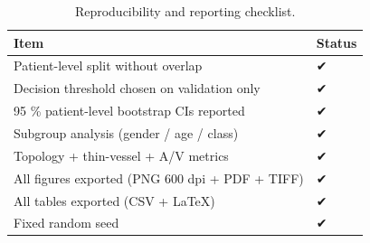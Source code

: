 \begin{table}
\caption{Reproducibility and reporting checklist.}
\label{tab:q1_checklist}
\begin{tabular}{ll}
\toprule
Item & Status \\
\midrule
Patient-level split without overlap & ✔ \\
Decision threshold chosen on validation only & ✔ \\
95 \% patient-level bootstrap CIs reported & ✔ \\
Subgroup analysis (gender / age / class) & ✔ \\
Topology + thin-vessel + A/V metrics & ✔ \\
All figures exported (PNG 600 dpi + PDF + TIFF) & ✔ \\
All tables exported (CSV + LaTeX) & ✔ \\
Fixed random seed & ✔ \\
\bottomrule
\end{tabular}
\end{table}
